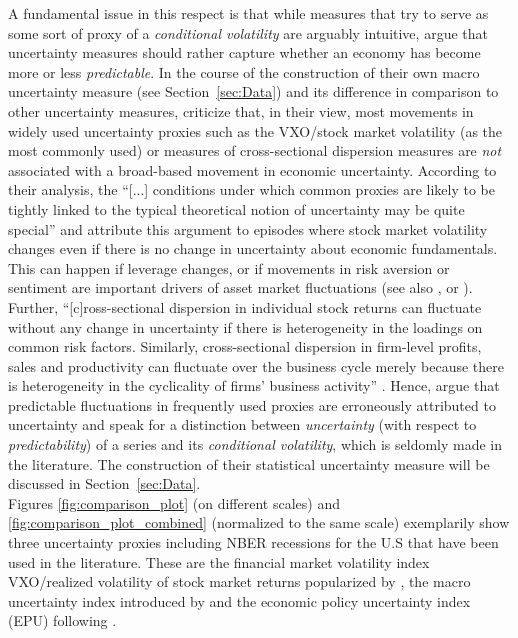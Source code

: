 \documentclass[a4paper,11pt,listof=nochaptergap,oneside,pointednumbers,bibtotoc,bigheadings,liststotoc,hidelinks]{scrbook}
\theoremstyle{mysatz}
\theoremstyle{mydefinition}
\theoremstyle{mytheorem}
\theoremstyle{mybemerkung}
\begin{document}
A fundamental issue in this respect is that while measures that try to serve as some sort of proxy of a \textit{conditional volatility} are arguably intuitive, \citet{juradoetal:15} argue that uncertainty measures should rather capture whether an economy has become more or less \textit{predictable}. In the course of the construction of their own macro uncertainty measure (see Section~\ref{sec:Data}) and its difference in comparison to other uncertainty measures, \citet{juradoetal:15} criticize that, in their view, most movements in widely used uncertainty proxies such as the VXO/stock market volatility (as the most commonly used) or measures of cross-sectional dispersion measures are \textit{not} associated with a broad-based movement in economic uncertainty. According to their analysis, the ``[...] conditions under which common proxies are likely to be tightly linked to the typical theoretical notion of uncertainty may be quite special'' \citep[p. 1178]{juradoetal:15} and attribute this argument to episodes where stock market volatility changes even if there is no change in uncertainty about economic fundamentals. This can happen if leverage changes, or if movements in risk aversion or sentiment are important drivers of asset market fluctuations (see also \citet{bekaertetal:13}, \citet{moore:17} or \citet{IMF:17}). Further, ``[c]ross-sectional dispersion in individual stock returns can fluctuate without any change in uncertainty if there is heterogeneity in the loadings on common risk factors. Similarly, cross-sectional dispersion in firm-level profits, sales and productivity can fluctuate over the business cycle merely because there is heterogeneity in the cyclicality of firms' business activity'' \citep[p. 1178]{juradoetal:15}. Hence, \citet{juradoetal:15} argue that predictable fluctuations in frequently used proxies are erroneously attributed to uncertainty and speak for a distinction between \textit{uncertainty} (with respect to \textit{predictability}) of a series and its \textit{conditional volatility}, which is seldomly made in the literature. The construction of their statistical uncertainty measure will be discussed in Section~\ref{sec:Data}.\\


Figures \ref{fig:comparison_plot} (on different scales) and \ref{fig:comparison_plot_combined} (normalized to the same scale) exemplarily show three uncertainty proxies including NBER recessions for the U.S that have been used in the literature. These are the financial market volatility index VXO/realized volatility of stock market returns popularized by \citet{bloom:09}, the macro uncertainty index introduced by \citet{juradoetal:15} and the economic policy uncertainty index (EPU) following \citet{bakeretal:15}.
\end{document}
